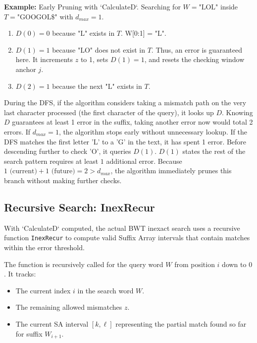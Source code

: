 \textbf{Example:} Early Pruning with `CalculateD`.
Searching for $W = \text{"LOL"}$ inside $T = \text{"GOOGOL\$"}$ with $d_{max} = 1$.
\begin{enumerate}
    \item $D(0) = 0$ because "L" exists in $T$. W[0:1] = "L".
    \item $D(1) = 1$ because "LO" does not exist in $T$. Thus, an error is guaranteed here. It increments $z$ to 1, sets $D(1) = 1$, and resets the checking window anchor $j$.
    \item $D(2) = 1$ because the next "L" exists in $T$.
\end{enumerate}
During the DFS, if the algorithm considers taking a mismatch path on the very last character processed (the first character of the query), it looks up $D$. Knowing $D$ guarantees at least 1 error in the suffix, taking another error now would total 2 errors. If $d_{max}=1$, the algorithm stops early without unnecessary lookup.
If the DFS matches the first letter 'L' to a 'G' in the text, it has spent 1 error. Before descending further to check 'O', it queries $D(1)$. $D(1)$ states the rest of the search pattern requires at least $1$ additional error. Because $1 \text{ (current)} + 1 \text{ (future)} = 2 > d_{max}$, the algorithm immediately prunes this branch without making further checks.

\newpage
\subsection{Recursive Search: InexRecur}

With `CalculateD` computed, the actual BWT inexact search uses a recursive function \texttt{InexRecur} to compute valid Suffix Array intervals that contain matches within the error threshold.

The function is recursively called for the query word $W$ from position $i$ down to $0$. It tracks:
\begin{itemize}
    \item The current index $i$ in the search word $W$.
    \item The remaining allowed mismatches $z$.
    \item The current SA interval $[k, \ell]$ representing the partial match found so far for suffix $W_{i+1}$.
\end{itemize}

